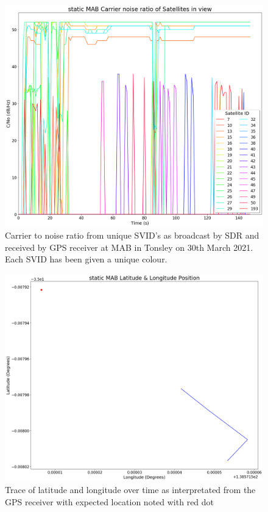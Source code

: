 \begin{figure}[h]
    \begin{centering}
        \includegraphics[width=14cm,keepaspectratio]{Figures/2021_3_30_static_MAB Carrier noise ratio.png}
        \caption{Carrier to noise ratio from unique SVID's as broadcast by SDR and received by GPS receiver at MAB in Tonsley on 30th March 2021. Each SVID has been given a unique colour.}
        \label{fig:MABStaticCNo}
    \end{centering}
\end{figure}

\begin{figure}[h]
    \begin{centering}
        \includegraphics[width=14cm,keepaspectratio]{Figures/2021_3_30_static_MAB Lat long position.png}
        \caption{Trace of latitude and longitude over time as interpretated from the GPS receiver with expected location noted with red dot}
        \label{fig:MABStaticCoord}
    \end{centering}
\end{figure}


